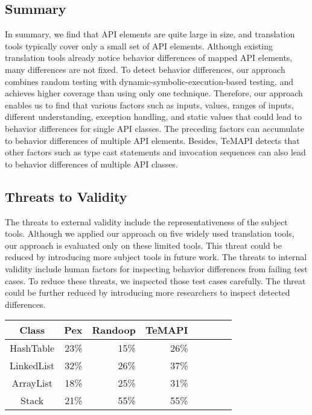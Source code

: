 \subsection{Summary}
\label{sec:evaluation:summary}
In summary, we find that API elements are quite large in size, and translation tools typically cover only a small set of API elements. Although existing translation tools already notice behavior differences of mapped API elements, many differences are not fixed. To detect behavior differences, our approach combines random testing with dynamic-symbolic-execution-based testing, and achieves higher coverage than using only one technique. Therefore, our approach enables us to find that various factors such as  inputs,  values, ranges of inputs, different understanding, exception handling, and static values that could lead to behavior differences for single API classes. The preceding factors can accumulate to behavior differences of multiple API elements. Besides, TeMAPI detects that other factors such as type cast statements and invocation sequences can also lead to behavior differences of multiple API classes.
\subsection{Threats to Validity}
\label{sec:evaluation:threat}
The threats to external validity include the representativeness of the subject tools. Although we applied
our approach on five widely used translation tools, our approach is evaluated only on these limited tools. This threat could be reduced by introducing more subject tools in future work. The threats to internal validity include human factors for inspecting behavior differences from failing test cases. To reduce these threats, we inspected those test cases carefully. The threat could be further
reduced by introducing more researchers to inspect detected differences.
\begin{table}[t]
\centering
\begin{SmallOut}
\begin {tabular} {|c|r|r|r|r|r|c|c|}
 \hline
\textbf{Class}& \textbf{Pex} & \textbf{Randoop}
& \textbf{TeMAPI} \\
\hline
HashTable                      &  23\%  & 15\%  &  26\%\\
\hline
LinkedList                     &  32\%  & 26\%  & 37\%\\
\hline
ArrayList                      &  18\%  & 25\%  &  31\%\\
\hline
Stack                          &  21\%   & 55\%  &  55\%\\
\hline
\end{tabular}\vspace*{-2ex}
 \label{table:coverageconverter}
\end{SmallOut}\vspace*{-4ex}
\end{table}